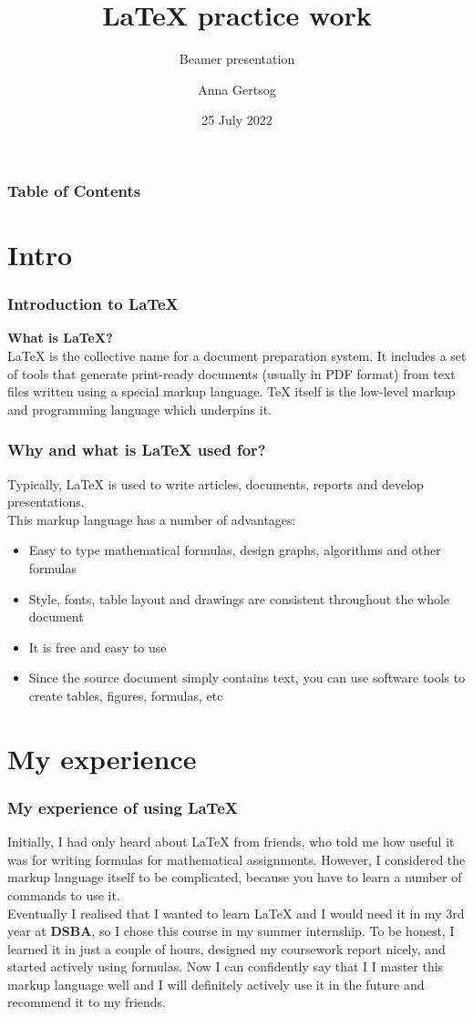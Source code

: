 \documentclass{beamer}
\title{LaTeX  practice work}
\subtitle{Beamer presentation}
\author{Anna Gertsog}
\institute[HSE]{Faculty of Computer Science,\\ Data Science and Business Analytics, \\ HSE University}
\date{25 July 2022}
\begin{document}
\frame{\titlepage}

\begin{frame}
\frametitle{Table of Contents}
\tableofcontents
\end{frame}

\section{Intro}
\begin{frame}
\frametitle{Introduction to LaTeX}
\textbf{What is LaTeX?}\\
LaTeX is the collective name for a document preparation system. It includes a set of tools that generate print-ready documents (usually in PDF format) from text files written using a special markup language. TeX itself is the low-level markup and programming language which underpins it.
\end{frame}

\begin{frame}
\frametitle{Why and what is LaTeX used for?}
Typically, LaTeX is used to write articles, documents, reports and develop presentations.\\
This markup language has a number of advantages:
\begin{itemize}
    \item Easy to type mathematical formulas, design graphs, algorithms and other formulas
    \item Style, fonts, table layout and drawings are consistent throughout the whole document
    \item It is free and easy to use
    \item Since the source document simply contains text, you can use software tools to create tables, figures, formulas, etc
\end{itemize}
\end{frame}

\section{My experience}

\begin{frame}
\frametitle{My experience of using LaTeX}

Initially, I had only heard about LaTeX from friends, who told me how useful it was for writing formulas for mathematical assignments.  However, I considered the markup language itself to be complicated, because you have to learn a number of commands to use it.\\
Eventually I realised that I wanted to learn LaTeX and I would need it in my 3rd year at \textbf{DSBA}, so I chose this course in my summer internship. To be honest, I learned it in just a couple of hours, designed my coursework report nicely, and started actively using formulas. Now I can confidently say that I  I master this markup language well and I will definitely actively use it in the future and recommend it to my friends.
\end{frame}
\end{document}
